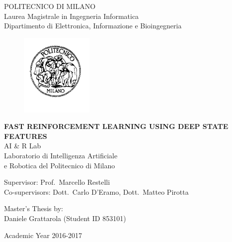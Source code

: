 \thispagestyle{empty}
\vspace*{-1.5cm} \bfseries{
\begin{center}
  \large
  POLITECNICO DI MILANO\\
  \normalsize
  Laurea Magistrale in Ingegneria Informatica\\
  Dipartimento di Elettronica, Informazione e Bioingegneria\\
  
  \vspace{0.6cm}
  \begin{figure}[htbp]
    \begin{center}
      \includegraphics[width=3.5cm]{pictures/logopm}
    \end{center}
  \end{figure}
  \vspace*{0.3cm} \LARGE



  \textbf{FAST REINFORCEMENT LEARNING USING DEEP STATE FEATURES}\\



  \vspace*{.75truecm} \large
  AI \& R Lab \\
  Laboratorio di Intelligenza Artificiale \\
  e Robotica del Politecnico di Milano
\end{center}
\vspace*{3.0cm} \large
\begin{flushleft}


  Supervisor: Prof.\ Marcello Restelli \\
  Co-supervisors: Dott.\ Carlo D'Eramo, Dott.\ Matteo Pirotta

\end{flushleft}
\vspace*{1.0cm}
\begin{flushright}


  Master's Thesis by:\\ Daniele Grattarola (Student ID 853101)


\end{flushright}
\vspace*{0.5cm}
\begin{center}



  Academic Year 2016-2017
\end{center} \clearpage
}
